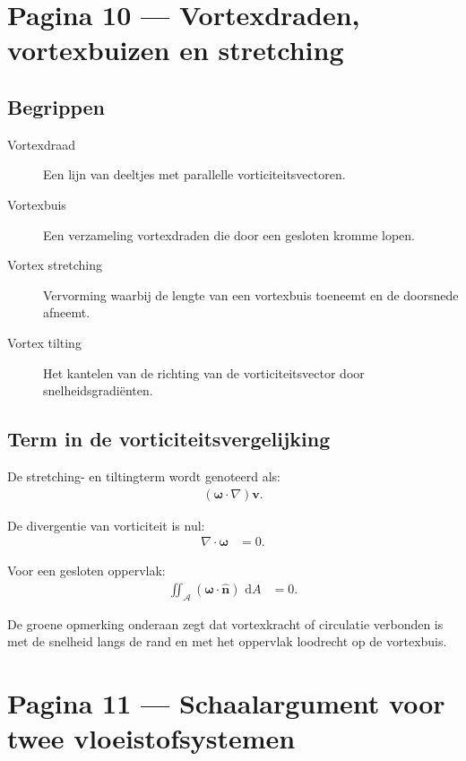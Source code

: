 \documentclass[11pt]{article}
\newcommand{\dd}{\,\mathrm{d}}
\newcommand{\vect}[1]{\mathbf{#1}}
\begin{document}
\section*{Pagina 10 --- Vortexdraden, vortexbuizen en stretching}

\subsection*{Begrippen}

\begin{description}
\item[Vortexdraad]
Een lijn van deeltjes met parallelle vorticiteitsvectoren.
\item[Vortexbuis]
Een verzameling vortexdraden die door een gesloten kromme lopen.
\item[Vortex stretching]
Vervorming waarbij de lengte van een vortexbuis toeneemt en de doorsnede afneemt.
\item[Vortex tilting]
Het kantelen van de richting van de vorticiteitsvector door snelheidsgradiënten.
\end{description}

\subsection*{Term in de vorticiteitsvergelijking}

De stretching- en tiltingterm wordt genoteerd als:
\begin{align*}
\left(\bm{\omega}\cdot\nabla\right)\vect{v}.
\end{align*}

De divergentie van vorticiteit is nul:
\begin{align*}
\nabla\cdot\bm{\omega}
  &=
  0.
\end{align*}

Voor een gesloten oppervlak:
\begin{align*}
\iint_{\mathcal{A}}
\left(\bm{\omega}\cdot\hat{\vect{n}}\right)\,\dd A
  &=
  0.
\end{align*}

De groene opmerking onderaan zegt dat vortexkracht of circulatie verbonden is met de snelheid langs de rand en met het oppervlak loodrecht op de vortexbuis.

\section*{Pagina 11 --- Schaalargument voor twee vloeistofsystemen}
\end{document}
